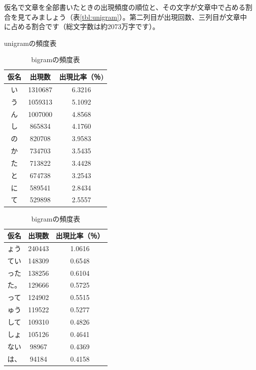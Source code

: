 仮名で文章を全部書いたときの出現頻度の順位と、その文字が文章中で占める割合を見てみましょう（表\ref{tbl:unigram}）。第二列目が出現回数、三列目が文章中に占める割合です（総文字数は約2073万字です）。

\begin{table}[ht]
 \begin{center}
  \begin{minipage}{0.45\hsize}
   \begin{center}
    \caption{unigramの頻度表}
    \begin{tabular}{ccc}
\hline
仮名 & 出現数 & 出現比率（％) \\
\hline
い & 1310687 & 6.3216 \\
う & 1059313 & 5.1092 \\
ん & 1007000 & 4.8568 \\
し & 865834 & 4.1760 \\
の & 820708 & 3.9583 \\
か & 734703 & 3.5435 \\
た & 713822 & 3.4428 \\
と & 674738 & 3.2543 \\
に & 589541 & 2.8434 \\
て & 529898 & 2.5557 \\
\hline
    \end{tabular}
    \label{tbl:unigram}
   \end{center}
  \end{minipage}
  \begin{minipage}{0.45\hsize}
   \begin{center}
    \caption{bigramの頻度表}
    \begin{tabular}{ccc}
\hline
仮名 & 出現数 & 出現比率（％） \\
\hline
ょう & 240443 & 1.0616 \\
てい & 148309 & 0.6548 \\
った & 138256 & 0.6104 \\
た。 & 129666 & 0.5725 \\
って & 124902 & 0.5515 \\
ゅう & 119522 & 0.5277 \\
して & 109310 & 0.4826 \\
しょ & 105126 & 0.4641 \\
ない & 98967 & 0.4369 \\
は、 & 94184 & 0.4158 \\
\hline
     \end{tabular}
     \label{tbl:bigram}
   \end{center}
  \end{minipage}
 \end{center}
\end{table}

